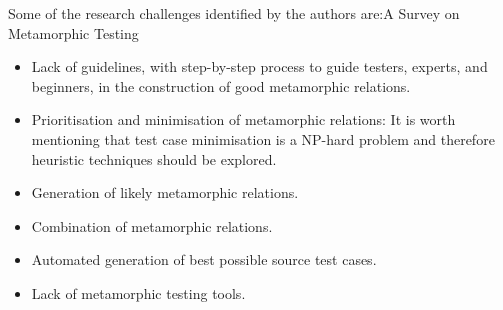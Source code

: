 		Some of the research challenges identified by the authors are:{A Survey on Metamorphic Testing \cite{Segura2016}}
		\begin{itemize}
			\item Lack of guidelines, with step-by-step process to guide testers, experts, and beginners, in the construction of good metamorphic relations.
			\item Prioritisation and minimisation of metamorphic relations: It is worth mentioning that test case minimisation is a NP-hard problem and therefore heuristic techniques should be explored.
			\item Generation of likely metamorphic relations.
			\item Combination of metamorphic relations.
			\item Automated generation of best possible source test cases.
			\item Lack of metamorphic testing tools.
		\end{itemize}
